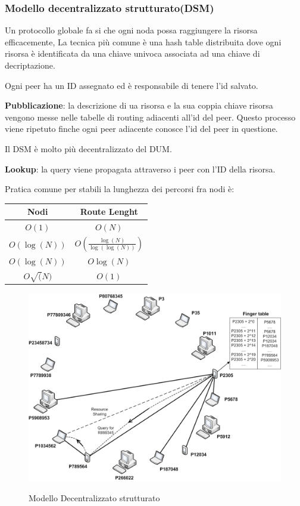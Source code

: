 \subsubsection{Modello decentralizzato strutturato(DSM)}

Un protocollo globale fa si che ogni noda possa raggiungere la risorsa efficacemente,
La tecnica più comune è una hash table distribuita dove ogni risorsa è identificata da una chiave univoca associata ad una chiave di decriptazione.

Ogni peer ha un ID assegnato ed è responsabile di tenere l'id salvato.

\textbf{Pubblicazione}: la descrizione di ua risorsa e la sua coppia chiave risorsa vengono messe nelle tabelle di routing adiacenti all'id del peer. 
Questo processo viene ripetuto finche ogni peer adiacente conosce l'id del peer in questione.


Il DSM è molto più decentralizzato del DUM.

\textbf{Lookup}: la query viene propagata attraverso i peer con l'ID della risorsa.

Pratica comune per stabili la lunghezza dei percorsi fra nodi è:

\begin{center}
    \begin{tabular}{| c | c |}
        \hline
        Nodi & Route Lenght \\
        \hline
        $O(1)$ & $O(N)$ \\
        \hline
        $O(\log(N))$ & $O(\frac{\log(N)}{\log(\log(N))})$ \\
        \hline
        $O(\log(N))$ & $O\log(N)$ \\
        \hline
        $O\sqrt(N)$ & $O(1)$ \\
        \hline
    \end{tabular}
\end{center}

\begin{figure}[h!]
    \centering
    \includegraphics[width=0.5\linewidth]{imgs/10 - DSM.png}
    \label{fig:p2pDSM}
    \caption{Modello Decentralizzato strutturato}
\end{figure}

